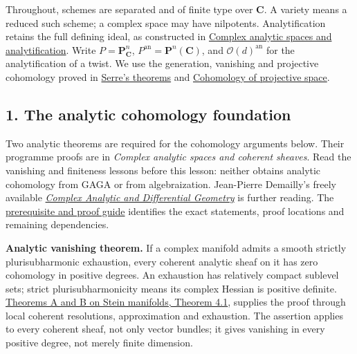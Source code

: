 \documentclass[11pt]{article}
\begin{document}
Throughout, schemes are separated and of finite type over \(\mathbf C\).
A variety means a reduced such scheme; a complex space may have
nilpotents. Analytification retains the full defining ideal, as
constructed in
\href{complex-analytic-spaces-and-analytification.html}{Complex analytic
spaces and analytification}. Write \(P=\mathbf P^n_{\mathbf C}\),
\(P^{\mathrm{an}}=\mathbf P^n(\mathbf C)\), and
\(\mathcal O(d)^{\mathrm{an}}\) for the analytification of a twist. We
use the generation, vanishing and projective cohomology proved in
\href{serres-theorems-on-projective-schemes.html}{Serre's theorems} and
\href{cohomology-of-projective-space.html}{Cohomology of projective
space}.

\subsection{1. The analytic cohomology
foundation}\label{the-analytic-cohomology-foundation}

Two analytic theorems are required for the cohomology arguments below.
Their programme proofs are in \emph{Complex analytic spaces and coherent
sheaves}. Read the vanishing and finiteness lessons before this lesson:
neither obtains analytic cohomology from GAGA or from algebraization.
Jean-Pierre Demailly's freely available
\href{https://www-fourier.univ-grenoble-alpes.fr/~demailly/manuscripts/agbook.pdf}{\emph{Complex
Analytic and Differential Geometry}} is further reading. The
\href{prerequisites.html}{prerequisite and proof guide} identifies the
exact statements, proof locations and remaining dependencies.

\textbf{Analytic vanishing theorem.} If a complex manifold admits a
smooth strictly plurisubharmonic exhaustion, every coherent analytic
sheaf on it has zero cohomology in positive degrees. An exhaustion has
relatively compact sublevel sets; strict plurisubharmonicity means its
complex Hessian is positive definite.
\href{../complex-analytic-spaces-and-coherent-sheaves/theorems-a-and-b-on-stein-manifolds.html\#4-theorem-b}{Theorems
A and B on Stein manifolds, Theorem 4.1}, supplies the proof through
local coherent resolutions, approximation and exhaustion. The assertion
applies to every coherent sheaf, not only vector bundles; it gives
vanishing in every positive degree, not merely finite dimension.
\end{document}
